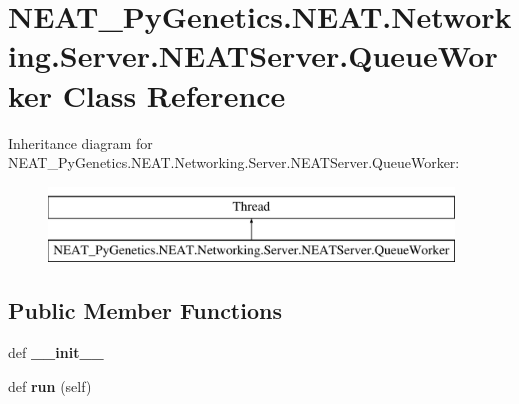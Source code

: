 \hypertarget{class_n_e_a_t___py_genetics_1_1_n_e_a_t_1_1_networking_1_1_server_1_1_n_e_a_t_server_1_1_queue_worker}{}\section{N\+E\+A\+T\+\_\+\+Py\+Genetics.\+N\+E\+A\+T.\+Networking.\+Server.\+N\+E\+A\+T\+Server.\+Queue\+Worker Class Reference}
\label{class_n_e_a_t___py_genetics_1_1_n_e_a_t_1_1_networking_1_1_server_1_1_n_e_a_t_server_1_1_queue_worker}
Inheritance diagram for N\+E\+A\+T\+\_\+\+Py\+Genetics.\+N\+E\+A\+T.\+Networking.\+Server.\+N\+E\+A\+T\+Server.\+Queue\+Worker\+:\begin{figure}[H]
\begin{center}
\leavevmode
\includegraphics[height=2.000000cm]{class_n_e_a_t___py_genetics_1_1_n_e_a_t_1_1_networking_1_1_server_1_1_n_e_a_t_server_1_1_queue_worker}
\end{center}
\end{figure}
\subsection*{Public Member Functions}
\begin{DoxyCompactItemize}
\item 
def {\bfseries \+\_\+\+\_\+init\+\_\+\+\_\+}\hypertarget{class_n_e_a_t___py_genetics_1_1_n_e_a_t_1_1_networking_1_1_server_1_1_n_e_a_t_server_1_1_queue_worker_a413e2f230b433bfc4f137f1ae1a331e5}{}\label{class_n_e_a_t___py_genetics_1_1_n_e_a_t_1_1_networking_1_1_server_1_1_n_e_a_t_server_1_1_queue_worker_a413e2f230b433bfc4f137f1ae1a331e5}

\item 
def {\bfseries run} (self)\hypertarget{class_n_e_a_t___py_genetics_1_1_n_e_a_t_1_1_networking_1_1_server_1_1_n_e_a_t_server_1_1_queue_worker_a856d13880c0616f9b0c25b02788a54e3}{}\label{class_n_e_a_t___py_genetics_1_1_n_e_a_t_1_1_networking_1_1_server_1_1_n_e_a_t_server_1_1_queue_worker_a856d13880c0616f9b0c25b02788a54e3}

\end{DoxyCompactItemize}
